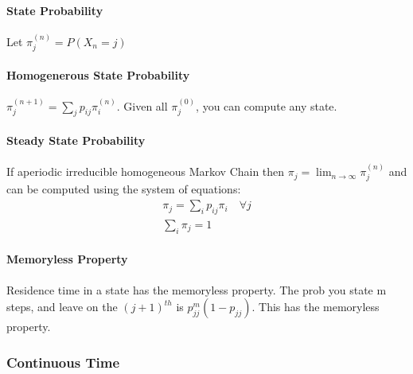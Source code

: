 \paragraph{State Probability}
Let $\pi_j^{(n)} = P(X_n = j)$

\paragraph{Homogenerous State Probability}
$\pi_j^{(n+1)} = \sum_j p_{ij} \pi_i^{(n)}$. Given all $\pi_j^{(0)}$, you can
compute any state.

\paragraph{Steady State Probability} If aperiodic irreducible homogeneous Markov
Chain then $\pi_j = \lim_{n \to \infty} \pi_j^{(n)}$ and can be computed using
the system of equations:
\begin{align*}
	\pi_j = \sum_i p_{ij} \pi_i \quad \forall j \\
	\sum_i \pi_j = 1
\end{align*}

\paragraph{Memoryless Property} Residence time in a state has the memoryless
property. The prob you state m steps, and leave on the $(j+1)^{th}$ is
$p_{jj}^m(1-p_{jj})$. This has the memoryless property.

\subsubsection{Continuous Time}



